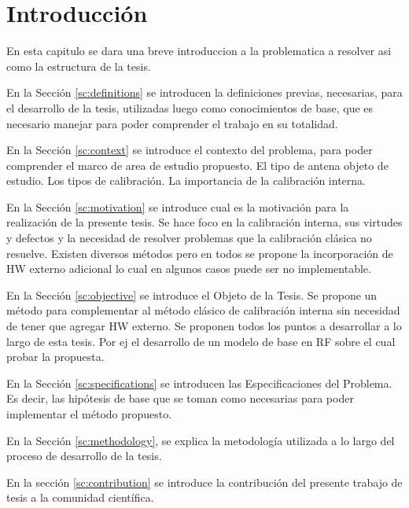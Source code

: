 
\chapter{Introducción} %

\label{ch:introduccion} %

En esta capitulo se dara una breve introduccion a la problematica a resolver asi como la estructura de la tesis.

En la Sección \ref{sc:definitions} se introducen la definiciones previas, necesarias, para el desarrollo de la tesis, utilizadas
luego como conocimientos de base, que es necesario manejar para poder comprender el trabajo en su totalidad.

En la Sección \ref{sc:context} se introduce el contexto del problema, para poder comprender el marco de area de estudio
propuesto. El tipo de antena objeto de estudio. Los tipos de calibración. La importancia de la calibración interna.

En la Sección \ref{sc:motivation} se introduce cual es la motivación para la realización de la presente tesis. Se hace foco
en la calibración interna, sus virtudes y defectos y la necesidad de resolver problemas que la calibración clásica no resuelve.
Existen diversos métodos pero en todos se propone la incorporación de HW externo adicional lo cual en algunos casos puede ser
no implementable.

En la Sección \ref{sc:objective} se introduce el Objeto de la Tesis. Se propone un método para complementar al método clásico
de calibración interna sin necesidad de tener que agregar HW externo. Se proponen todos los puntos a desarrollar a lo largo de
esta tesis. Por ej el desarrollo de un modelo de base en RF sobre el cual probar la propuesta.

En la Sección \ref{sc:specifications} se introducen las Especificaciones del Problema. Es decir, las hipótesis de base que se
toman como necesarias para poder implementar el método propuesto.

En la Sección \ref{sc:methodology}, se explica la metodología utilizada a lo largo del proceso de desarrollo de la tesis.

En la sección \ref{sc:contribution} se introduce la contribución del presente trabajo de tesis a la comunidad científica.


